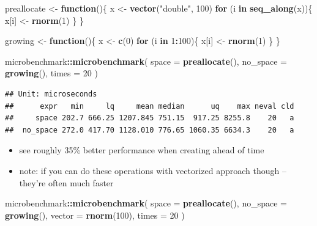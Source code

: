 \documentclass[]{book}
\newenvironment{Shaded}{\begin{snugshade}}{\end{snugshade}}
\newcommand{\ControlFlowTok}[1]{\textcolor[rgb]{0.13,0.29,0.53}{\textbf{#1}}}
\newcommand{\DataTypeTok}[1]{\textcolor[rgb]{0.13,0.29,0.53}{#1}}
\newcommand{\DecValTok}[1]{\textcolor[rgb]{0.00,0.00,0.81}{#1}}
\newcommand{\KeywordTok}[1]{\textcolor[rgb]{0.13,0.29,0.53}{\textbf{#1}}}
\newcommand{\NormalTok}[1]{#1}
\newcommand{\OperatorTok}[1]{\textcolor[rgb]{0.81,0.36,0.00}{\textbf{#1}}}
\newcommand{\StringTok}[1]{\textcolor[rgb]{0.31,0.60,0.02}{#1}}
\theoremstyle{definition}
\theoremstyle{definition}
\theoremstyle{definition}
\theoremstyle{remark}
\begin{document}
\begin{enumerate}
\begin{Shaded}
\begin{Highlighting}[]
\NormalTok{preallocate <-}\StringTok{ }\ControlFlowTok{function}\NormalTok{()\{}
\NormalTok{x <-}\StringTok{ }\KeywordTok{vector}\NormalTok{(}\StringTok{"double"}\NormalTok{, }\DecValTok{100}\NormalTok{)}
  \ControlFlowTok{for}\NormalTok{ (i }\ControlFlowTok{in} \KeywordTok{seq_along}\NormalTok{(x))\{}
\NormalTok{    x[i] <-}\StringTok{ }\KeywordTok{rnorm}\NormalTok{(}\DecValTok{1}\NormalTok{)}
\NormalTok{  \}}
\NormalTok{\}}

\NormalTok{growing <-}\StringTok{ }\ControlFlowTok{function}\NormalTok{()\{}
\NormalTok{  x <-}\StringTok{ }\KeywordTok{c}\NormalTok{(}\DecValTok{0}\NormalTok{)}
    \ControlFlowTok{for}\NormalTok{ (i }\ControlFlowTok{in} \DecValTok{1}\OperatorTok{:}\DecValTok{100}\NormalTok{)\{}
\NormalTok{      x[i] <-}\StringTok{ }\KeywordTok{rnorm}\NormalTok{(}\DecValTok{1}\NormalTok{)}
\NormalTok{  \}}
\NormalTok{\}}

\NormalTok{microbenchmark}\OperatorTok{::}\KeywordTok{microbenchmark}\NormalTok{(}
  \DataTypeTok{space =} \KeywordTok{preallocate}\NormalTok{(),}
  \DataTypeTok{no_space =} \KeywordTok{growing}\NormalTok{(),}
  \DataTypeTok{times =} \DecValTok{20}
\NormalTok{)  }
\end{Highlighting}
\end{Shaded}

\begin{verbatim}
## Unit: microseconds
##      expr   min     lq     mean median      uq    max neval cld
##     space 202.7 666.25 1207.845 751.15  917.25 8255.8    20   a
##  no_space 272.0 417.70 1128.010 776.65 1060.35 6634.3    20   a
\end{verbatim}

  \begin{itemize}
  \item
    see roughly 35\% better performance when creating ahead of time
  \item
    note: if you can do these operations with vectorized approach though
    -- they're often much faster
  \end{itemize}

\begin{Shaded}
\begin{Highlighting}[]
\NormalTok{microbenchmark}\OperatorTok{::}\KeywordTok{microbenchmark}\NormalTok{(}
  \DataTypeTok{space =} \KeywordTok{preallocate}\NormalTok{(),}
  \DataTypeTok{no_space =} \KeywordTok{growing}\NormalTok{(),}
  \DataTypeTok{vector =} \KeywordTok{rnorm}\NormalTok{(}\DecValTok{100}\NormalTok{),}
  \DataTypeTok{times =} \DecValTok{20}
\NormalTok{)}
\end{Highlighting}
\end{Shaded}


\end{enumerate}
\end{document}
